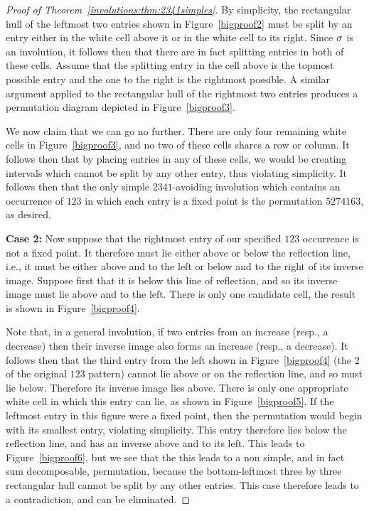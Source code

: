 \begin{proof}[Proof of Theorem~\ref{involutions:thm:2341simples}]
        By simplicity, the rectangular hull of the leftmost two entries shown
        in Figure~\ref{bigproof2} must be split by an entry either in the white
        cell above it or in the white cell to its right. Since $\sigma$ is an
        involution, it follows then that there are in fact splitting entries in
        both of these cells. Assume that the splitting entry in the cell above
        is the topmost possible entry and the one to the right is the rightmost
        possible. A similar argument applied to the rectangular hull of the
        rightmost two entries produces a permutation diagram depicted in
        Figure~\ref{bigproof3}. 

        We now claim that we can go no further. There are only four remaining
        white cells in Figure~\ref{bigproof3}, and no two of these cells shares
        a row or column. It follows then that by placing entries in any of
        these cells, we would be creating intervals which cannot be split by
        any other entry, thus violating simplicity. It follows then that the
        only simple $2341$-avoiding involution which contains an occurrence of
        $123$ in which each entry is a fixed point is the permutation
        $5274163$, as desired. 
        

        \textbf{Case 2:}
        Now suppose that the rightmost entry of our specified $123$ occurrence
        is not a fixed point. It therefore must lie either above or below the
        reflection line, i.e., it must be either above and to the left or
        below and to the right of its inverse image. Suppose first that it is
        below this line of reflection, and so its inverse image must lie above
        and to the left. There is only one candidate cell, the result is shown
        in Figure~\ref{bigproof4}.


        Note that, in a general involution, if two entries from an increase
        (resp., a decrease) then their inverse image also forms an increase
        (resp., a decrease). It follows then that the third entry from the left
        shown in Figure~\ref{bigproof4} (the $2$ of the original $123$ pattern)
        cannot lie above or on the reflection line, and so must lie below.
        Therefore its inverse image lies above. There is only one appropriate
        white cell in which this entry can lie, as shown in
        Figure~\ref{bigproof5}. If the leftmost entry in this figure were a
        fixed point, then the permutation would begin with its smallest entry,
        violating simplicity. This entry therefore lies below the reflection
        line, and has an inverse above and to its left. This leads to
        Figure~\ref{bigproof6}, but we see that the this leads to a non simple,
        and in fact sum decomposable, permutation, because the bottom-leftmost
        three by three rectangular hull cannot be split by any other entries.
        This case therefore leads to a contradiction, and can be eliminated. 
        

\end{proof}
